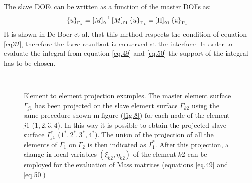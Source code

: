 The slave DOFs can be written as a function of the master DOFs as:
\begin{equation}
\label{eq.51}
\left\lbrace{u}\right \rbrace_{\Gamma_2}=\left[{M}\right]_2^{-1}\left[{M}\right]_{21}\left\lbrace{u}\right \rbrace_{\Gamma_1}=\left[{\Pi}\right]_{21}\left\lbrace{u}\right \rbrace_{\Gamma_1}
\end{equation}
It is shown in De Boer et al. \cite{de2007review}  that this method respects the condition of equation \eqref{eq32}, therefore the force resultant is conserved at the interface.
In order to evaluate the integral from equation \eqref{eq.49} and \eqref{eq.50} the support of the integral has to be chosen.

 \begin{figure}[!ht]
 \centering
      \\
 
  
  \caption{Element to element projection examples. The master element surface $\Gamma_{j1}$ has been projected on the slave element surface $\Gamma_{k2}$ using the same procedure shown in figure (\ref{fig.8}) for each node of the element $j1$ ($1,2,3,4$). In this way it is possible to obtain the projected slave surface $\Gamma_{j1}^*$ ($1^*,2^*,3^*,4^*$). The union of the projection of all the elements of $\Gamma_1$ on $\Gamma_2$ is then indicated as $\Gamma_1^*$. After this projection, a change in local variables $(\xi_{k2},\eta_{k2})$ of the element $k2$ can be employed for the evaluation of Mass matrices (equations \eqref{eq.49} and \eqref{eq.50})}
  \label{fig.9}
\end{figure}
